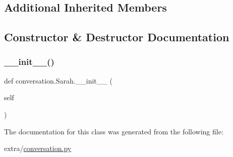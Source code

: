 \subsection*{Additional Inherited Members}


\subsection{Constructor \& Destructor Documentation}
\mbox{\label{classconversation_1_1Sarah_a12c3e90cec8309ef7260fcef838277dc}} 
\subsubsection{\texorpdfstring{\+\_\+\+\_\+init\+\_\+\+\_\+()}{\_\_init\_\_()}}
{\footnotesize\ttfamily def conversation.\+Sarah.\+\_\+\+\_\+init\+\_\+\+\_\+ (\begin{DoxyParamCaption}\item[{}]{self }\end{DoxyParamCaption})}



The documentation for this class was generated from the following file\+:\begin{DoxyCompactItemize}
\item 
extra/\hyperlink{conversation_8py}{conversation.\+py}\end{DoxyCompactItemize}
